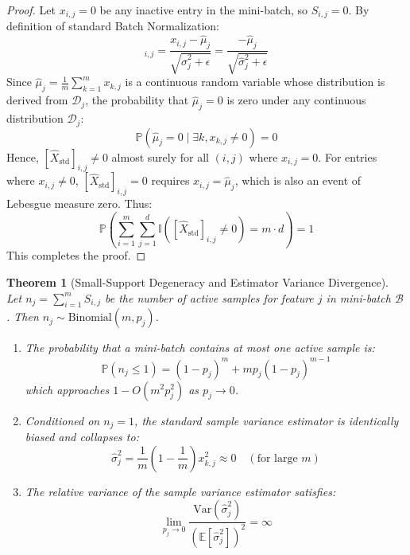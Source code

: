 \documentclass[twocolumn,10pt]{article}
\newtheorem{theorem}{Theorem}
\begin{document}
\begin{proof}
Let $x_{i,j} = 0$ be any inactive entry in the mini-batch, so $S_{i,j} = 0$. By definition of standard Batch Normalization:
\begin{equation}
[\hat{X}_{\mathrm{std}}]_{i,j} = \frac{x_{i,j} - \hat{\mu}_j}{\sqrt{\hat{\sigma}_j^2 + \epsilon}} = \frac{-\hat{\mu}_j}{\sqrt{\hat{\sigma}_j^2 + \epsilon}}
\end{equation}
Since $\hat{\mu}_j = \frac{1}{m}\sum_{k=1}^m x_{k,j}$ is a continuous random variable whose distribution is derived from $\mathcal{D}_j$, the probability that $\hat{\mu}_j = 0$ is zero under any continuous distribution $\mathcal{D}_j$:
\begin{equation}
\mathbb{P}(\hat{\mu}_j = 0 \mid \exists k, x_{k,j} \neq 0) = 0
\end{equation}
Hence, $[\hat{X}_{\mathrm{std}}]_{i,j} \neq 0$ almost surely for all $(i, j)$ where $x_{i,j} = 0$. For entries where $x_{i,j} \neq 0$, $[\hat{X}_{\mathrm{std}}]_{i,j} = 0$ requires $x_{i,j} = \hat{\mu}_j$, which is also an event of Lebesgue measure zero. Thus:
\begin{equation}
\mathbb{P}\left(\sum_{i=1}^m \sum_{j=1}^d \mathbb{I}([\hat{X}_{\mathrm{std}}]_{i,j} \neq 0) = m \cdot d\right) = 1
\end{equation}
This completes the proof.
\end{proof}

\begin{theorem}[Small-Support Degeneracy and Estimator Variance Divergence]
\label{thm:variance_divergence}
Let $n_j = \sum_{i=1}^m S_{i,j}$ be the number of active samples for feature $j$ in mini-batch $\mathcal{B}$. Then $n_j \sim \mathrm{Binomial}(m, p_j)$. 
\begin{enumerate}
    \item The probability that a mini-batch contains at most one active sample is:
    \begin{equation}
    \mathbb{P}(n_j \le 1) = (1 - p_j)^m + m p_j (1 - p_j)^{m-1}
    \end{equation}
    which approaches $1 - O(m^2 p_j^2)$ as $p_j \to 0$.
    \item Conditioned on $n_j = 1$, the standard sample variance estimator is identically biased and collapses to:
    \begin{equation}
    \hat{\sigma}_j^2 = \frac{1}{m}\left(1 - \frac{1}{m}\right) x_{k,j}^2 \approx 0 \quad (\text{for large } m)
    \end{equation}
    \item The relative variance of the sample variance estimator satisfies:
    \begin{equation}
    \lim_{p_j \to 0} \frac{\mathrm{Var}(\hat{\sigma}_j^2)}{(\mathbb{E}[\hat{\sigma}_j^2])^2} = \infty
    \end{equation}
\end{enumerate}
\end{theorem}
\end{document}
